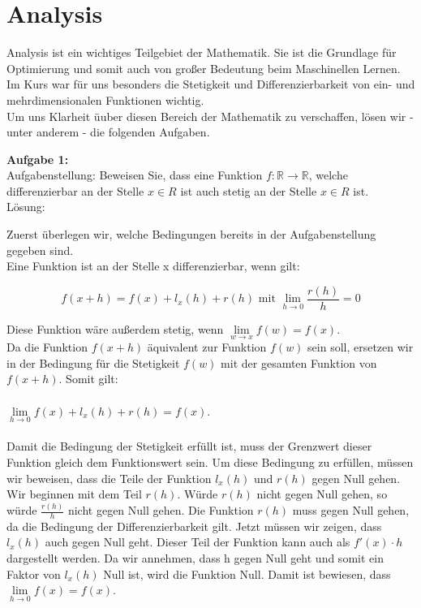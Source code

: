 \section{Analysis}
Analysis ist ein wichtiges Teilgebiet der Mathematik. Sie ist die Grundlage für Optimierung und somit auch von großer Bedeutung beim Maschinellen Lernen. \\
Im Kurs war für uns besonders die Stetigkeit und Differenzierbarkeit von ein- und mehrdimensionalen Funktionen wichtig. \\
Um uns Klarheit üuber diesen Bereich der Mathematik zu verschaffen, lösen wir - unter anderem - die folgenden Aufgaben.

\vspace{15pt}

\textbf{Aufgabe 1:} \\
Aufgabenstellung:
Beweisen Sie, dass eine Funktion $f:\mathds{R} \rightarrow \mathds{R}$, welche differenzierbar an der Stelle $x \in R$ ist auch stetig an der Stelle $x \in R$ ist.\\ %

Lösung:

Zuerst überlegen wir, welche Bedingungen bereits in der Aufgabenstellung gegeben sind. \\
Eine Funktion ist an der Stelle x differenzierbar, wenn gilt:

\begin{equation}f(x+h)=f(x)+l_x(h)+ r(h) \text{ mit } \lim\limits_{h \rightarrow 0} \frac{r(h)}{h}= 0 \end{equation} 

Diese Funktion wäre außerdem stetig, wenn $\lim\limits_{w \rightarrow x} f(w)=f(x)$.\\
Da die Funktion $f(x+h)$ äquivalent zur Funktion $f(w)$ sein soll, ersetzen wir in der Bedingung für die Stetigkeit $f(w)$ mit der gesamten Funktion von $f(x+h)$.  
Somit gilt: \\ \\
$\lim\limits_{h \rightarrow 0} f(x)+l_x(h)+r(h)=f(x)$. \\ \\

Damit die Bedingung der Stetigkeit erfüllt ist, muss der Grenzwert dieser Funktion gleich dem Funktionswert sein. Um diese Bedingung zu erfüllen, müssen wir beweisen, dass die Teile der Funktion $l_x(h)$ und $r(h)$ gegen Null gehen. Wir beginnen mit dem Teil $r(h)$.  Würde $r(h)$ nicht gegen Null gehen, so würde $\frac{r(h)}{h}$ nicht gegen Null gehen. Die Funktion $r(h)$ muss gegen Null gehen, da die Bedingung der Differenzierbarkeit gilt. Jetzt müssen wir zeigen, dass $l_x(h)$ auch gegen Null geht. Dieser Teil der Funktion kann auch als $f'(x) \cdot h$ dargestellt werden. Da wir annehmen, dass h gegen Null geht und somit ein Faktor von $l_x(h)$ Null ist, wird die Funktion Null. Damit ist bewiesen, dass $\lim\limits_{h \rightarrow 0} f(x)=f(x)$. \\

